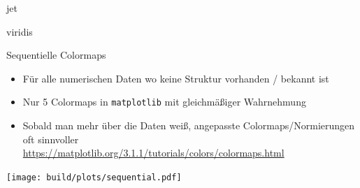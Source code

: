 \documentclass[aspectratio=1610, 9pt]{beamer}
\begin{document}
\begin{frame}[plain]{jet}
\end{frame}

\begin{frame}[plain]{viridis}
\end{frame}

\begin{frame}[c]{Sequentielle Colormaps}
  \begin{itemize}
    \item Für alle numerischen Daten wo
      keine Struktur vorhanden / bekannt ist
    \item Nur 5 Colormaps in \texttt{matplotlib} mit gleichmäßiger Wahrnehmung
    \item Sobald man mehr über die Daten weiß, 
      angepasste Colormaps/Normierungen oft sinnvoller \\
    \url{https://matplotlib.org/3.1.1/tutorials/colors/colormaps.html}
  \end{itemize}
  \vspace{0.5cm}
  \texttt{[image: build/plots/sequential.pdf]}
\end{frame}
\end{document}
